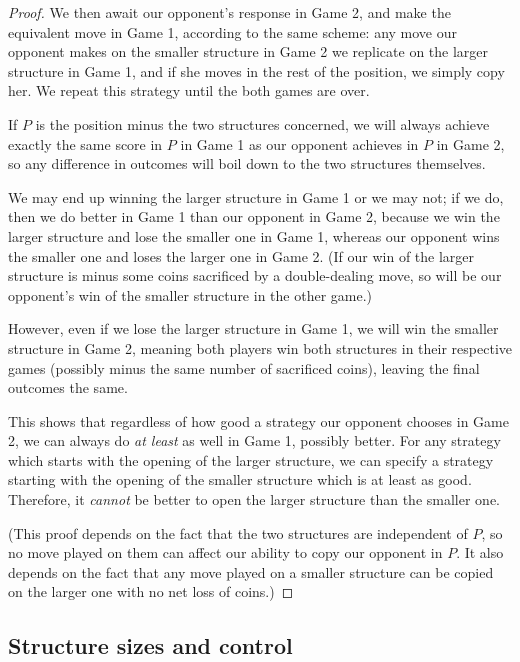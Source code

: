 \documentclass[a4paper,twocolumn]{article}
\begin{document}
\begin{proof}
  We then await our opponent's response in Game 2, and make the
  equivalent move in Game 1, according to the same scheme: any move
  our opponent makes on the smaller structure in Game 2 we replicate
  on the larger structure in Game 1, and if she moves in the rest of
  the position, we simply copy her. We repeat this strategy until the
  both games are over.

  If $P$ is the position minus the two structures concerned, we will
  always achieve exactly the same score in $P$ in Game 1 as our
  opponent achieves in $P$ in Game 2, so any difference in outcomes
  will boil down to the two structures themselves.

  We may end up winning the larger structure in Game 1 or we may not;
  if we do, then we do better in Game 1 than our opponent in Game 2,
  because we win the larger structure and lose the smaller one in Game
  1, whereas our opponent wins the smaller one and loses the larger
  one in Game 2. (If our win of the larger structure is minus some
  coins sacrificed by a double-dealing move, so will be our opponent's
  win of the smaller structure in the other game.)

  However, even if we lose the larger structure in Game 1, we will win
  the smaller structure in Game 2, meaning both players win both
  structures in their respective games (possibly minus the same number
  of sacrificed coins), leaving the final outcomes the same.

  This shows that regardless of how good a strategy our opponent
  chooses in Game 2, we can always do \emph{at least} as well in Game
  1, possibly better. For any strategy which starts with the opening
  of the larger structure, we can specify a strategy starting with the
  opening of the smaller structure which is at least as
  good. Therefore, it \emph{cannot} be better to open the larger
  structure than the smaller one.

  (This proof depends on the fact that the two structures are
  independent of $P$, so no move played on them can affect our ability
  to copy our opponent in $P$. It also depends on the fact that any
  move played on a smaller structure can be copied on the larger one
  with no net loss of coins.)
\end{proof}

\subsection{Structure sizes and control}
\label{smallchains}
\end{document}
